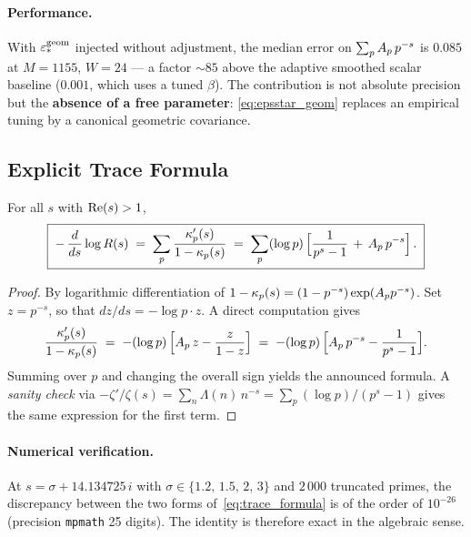 \paragraph{Performance.}
With $\varepsilon_{*}^{\mathrm{geom}}$ injected without adjustment, the median
error on $\sum_p A_p\,p^{-s}$ is $0.085$ at $M = 1155$, $W = 24$ --- a
factor $\sim 85$ above the adaptive smoothed scalar baseline
($0.001$, which uses a tuned $\beta$). The contribution is not absolute
precision but the \textbf{absence of a free parameter}: \eqref{eq:epsstar_geom}
replaces an empirical tuning by a canonical geometric covariance.

\subsection{Explicit Trace Formula}
\label{sec:trace_formula}

\begin{theoreme}
\label{thm:trace_formula}
For all $s$ with $\operatorname{Re}(s) > 1$,
\begin{equation}
\boxed{\;
-\,\dfrac{d}{ds} \log R(s)
\;=\; \sum_{p} \dfrac{\kappa_p'(s)}{1 - \kappa_p(s)}
\;=\; \sum_{p} (\log p)\,\Big[\dfrac{1}{p^s - 1} \,+\, A_p\,p^{-s}\Big]\,.\;}
\label{eq:trace_formula}
\end{equation}
\end{theoreme}

\begin{proof}
By logarithmic differentiation of
$1 - \kappa_p(s) = (1 - p^{-s}) \exp(A_p p^{-s})$. Set $z = p^{-s}$,
so that $dz/ds = -\log p \cdot z$. A direct computation gives
\[
\dfrac{\kappa_p'(s)}{1 - \kappa_p(s)}
\;=\; -(\log p)\,\Big[A_p\,z - \dfrac{z}{1 - z}\Big]
\;=\; -(\log p)\,\Big[A_p\,p^{-s} - \dfrac{1}{p^s - 1}\Big].
\]
Summing over $p$ and changing the overall sign yields the announced
formula. A \emph{sanity check} via $-\zeta'/\zeta(s) = \sum_n
\Lambda(n)\,n^{-s} = \sum_p (\log p)/(p^s - 1)$ gives the same expression
for the first term.
\end{proof}

\paragraph{Numerical verification.}
At $s = \sigma + 14.134725\,i$ with $\sigma \in \{1.2,\,1.5,\,2,\,3\}$ and
$2\,000$ truncated primes, the discrepancy between the two forms
of~\eqref{eq:trace_formula} is of the order of $10^{-26}$ (precision
\texttt{mpmath} 25 digits). The identity is therefore exact in the
algebraic sense.


